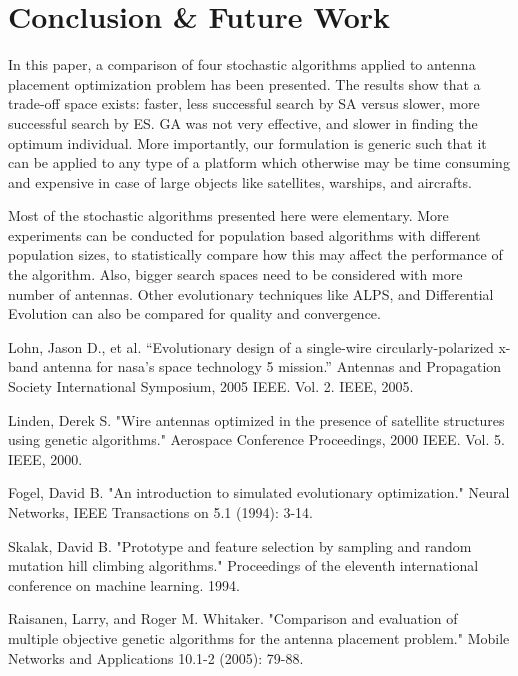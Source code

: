 \documentclass[conference]{IEEEtran}
\begin{document}
\section{Conclusion \& Future Work}
In this paper, a comparison of four stochastic algorithms applied to antenna placement optimization problem has been presented. The results show that a trade-off space exists: faster, less successful search by SA versus slower, more successful search by ES. GA was not very effective, and slower in finding the optimum individual. More importantly, our formulation is generic such that it can be applied to any type of a platform which otherwise may be time consuming and expensive in case of large objects like satellites, warships, and aircrafts. 

Most of the stochastic algorithms presented here were elementary. More experiments can be conducted for population based algorithms with different population sizes, to statistically compare how this may affect the performance of the algorithm. Also, bigger search spaces need to be considered with more number of antennas. Other evolutionary techniques like ALPS, and Differential Evolution can also be compared for quality and convergence.

\begin{thebibliography}{1}

Lohn, Jason D., et al. ``Evolutionary design of a single-wire circularly-polarized x-band antenna for nasa's space technology 5 mission.'' Antennas and Propagation Society International Symposium, 2005 IEEE. Vol. 2. IEEE, 2005.

Linden, Derek S. "Wire antennas optimized in the presence of satellite structures using genetic algorithms." Aerospace Conference Proceedings, 2000 IEEE. Vol. 5. IEEE, 2000.

Fogel, David B. "An introduction to simulated evolutionary optimization." Neural Networks, IEEE Transactions on 5.1 (1994): 3-14.

Skalak, David B. "Prototype and feature selection by sampling and random mutation hill climbing algorithms." Proceedings of the eleventh international conference on machine learning. 1994.

Raisanen, Larry, and Roger M. Whitaker. "Comparison and evaluation of multiple objective genetic algorithms for the antenna placement problem." Mobile Networks and Applications 10.1-2 (2005): 79-88.
\end{thebibliography}
\end{document}
